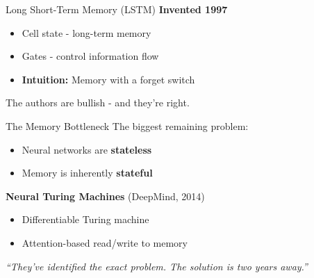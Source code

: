 \begin{frame}{Long Short-Term Memory (LSTM)}
    \textbf{Invented 1997}
    
    \vspace{1em}
    
    \begin{itemize}
        \item Cell state - long-term memory
        \item Gates - control information flow
        \item \textbf{Intuition:} Memory with a forget switch
    \end{itemize}
    
    \vspace{1em}
    The authors are bullish - and they're right.
\end{frame}

\begin{frame}{The Memory Bottleneck}
    The biggest remaining problem:
    
    \vspace{1em}
    \begin{itemize}
        \item Neural networks are \textbf{stateless}
        \item Memory is inherently \textbf{stateful}
    \end{itemize}
    
    \vspace{1em}
    \textbf{Neural Turing Machines} (DeepMind, 2014)
    \begin{itemize}
        \item Differentiable Turing machine
        \item Attention-based read/write to memory
    \end{itemize}
    
    \vspace{1em}
    \textit{``They've identified the exact problem. The solution is two years away.''}
\end{frame}
